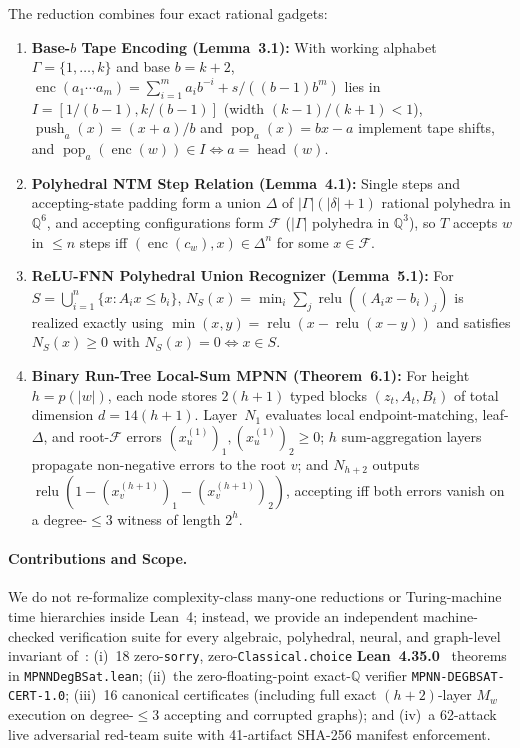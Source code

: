 \documentclass[10pt,twocolumn]{article}
\newcommand{\QQ}{\mathbb{Q}}
\newcommand{\enc}{\operatorname{enc}}
\newcommand{\push}{\operatorname{push}}
\newcommand{\pop}{\operatorname{pop}}
\newcommand{\relu}{\operatorname{relu}}
\begin{document}
The reduction combines four exact rational gadgets:
\begin{enumerate}[leftmargin=*,nosep]
  \item \textbf{Base-$b$ Tape Encoding (Lemma~3.1):} With working alphabet $\Gamma = \{1,\dots,k\}$ and base $b = k + 2$, $\enc(a_1\cdots a_m) = \sum_{i=1}^m a_i b^{-i} + s/((b-1)b^m)$ lies in $I = [1/(b-1), k/(b-1)]$ (width $(k-1)/(k+1) < 1$), $\push_a(x) = (x+a)/b$ and $\pop_a(x) = bx - a$ implement tape shifts, and $\pop_a(\enc(w)) \in I \iff a = \operatorname{head}(w)$.
  \item \textbf{Polyhedral NTM Step Relation (Lemma~4.1):} Single steps and accepting-state padding form a union $\Delta$ of $|\Gamma|(|\delta|+1)$ rational polyhedra in $\QQ^6$, and accepting configurations form $\mathcal{F}$ ($|\Gamma|$ polyhedra in $\QQ^3$), so $T$ accepts $w$ in $\le n$ steps iff $(\enc(c_w), x) \in \Delta^n$ for some $x \in \mathcal{F}$.
  \item \textbf{ReLU-FNN Polyhedral Union Recognizer (Lemma~5.1):} For $S = \bigcup_{i=1}^n \{x : A_i x \le b_i\}$, $N_S(x) = \min_i \sum_j \relu((A_i x - b_i)_j)$ is realized exactly using $\min(x, y) = \relu(x - \relu(x - y))$ and satisfies $N_S(x) \ge 0$ with $N_S(x) = 0 \iff x \in S$.
  \item \textbf{Binary Run-Tree Local-Sum MPNN (Theorem~6.1):} For height $h = p(|w|)$, each node stores $2(h+1)$ typed blocks $(z_t, A_t, B_t)$ of total dimension $d = 14(h+1)$. Layer~$N_1$ evaluates local endpoint-matching, leaf-$\Delta$, and root-$\mathcal{F}$ errors $(x_u^{(1)})_1, (x_u^{(1)})_2 \ge 0$; $h$ sum-aggregation layers propagate non-negative errors to the root $v$; and $N_{h+2}$ outputs $\relu(1 - (x_v^{(h+1)})_1 - (x_v^{(h+1)})_2)$, accepting iff both errors vanish on a degree-$\le 3$ witness of length $2^h$.
\end{enumerate}

\paragraph{Contributions and Scope.}
We do not re-formalize complexity-class many-one reductions or Turing-machine time hierarchies inside Lean~4; instead, we provide an independent machine-checked verification suite for every algebraic, polyhedral, neural, and graph-level invariant of~\cite{saelzer2026degbsat}:
(i)~18 zero-\texttt{sorry}, zero-\texttt{Classical.choice} \textbf{Lean~4.35.0}~\cite{demoura2021lean4} theorems in \texttt{MPNNDegBSat.lean};
(ii)~the zero-floating-point exact-$\QQ$ verifier \texttt{MPNN-DEGBSAT-CERT-1.0};
(iii)~16 canonical certificates (including full exact $(h+2)$-layer $M_w$ execution on degree-$\le 3$ accepting and corrupted graphs); and
(iv)~a 62-attack live adversarial red-team suite with 41-artifact SHA-256 manifest enforcement.
\end{document}
